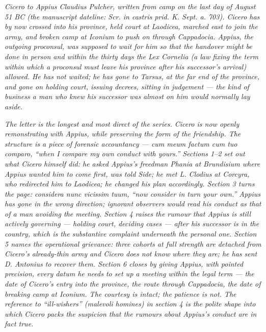 
\textit{Cicero to Appius Claudius Pulcher, written from
camp on the last day of August 51 BC (the manuscript
dateline: \textit{Scr. in castris prid. K. Sept. a.
703}). Cicero has by now crossed into his province,
held court at Laodicea, marched east to join the army,
and broken camp at Iconium to push on through
Cappadocia. Appius, the outgoing proconsul, was
supposed to wait for him so that the handover might be
done in person and within the thirty days the Lex
Cornelia (a law fixing the term within which a
proconsul must leave his province after his successor's
arrival) allowed. He has not waited; he has gone to
Tarsus, at the far end of the province, and gone on
holding court, issuing decrees, sitting in judgement
--- the kind of business a man who knew his successor
was almost on him would normally lay aside.}

\textit{The letter is the longest and most direct of
the series. Cicero is now openly remonstrating with
Appius, while preserving the form of the friendship.
The structure is a piece of forensic accountancy ---
\textit{cum meum factum cum tuo comparo}, ``when I
compare my own conduct with yours.'' Sections 1--2 set
out what Cicero himself did: he asked Appius's freedman
Phania at Brundisium where Appius wanted him to come
first, was told Side; he met L. Clodius at Corcyra,
who redirected him to Laodicea; he changed his plan
accordingly. Section 3 turns the page: \textit{considera
nunc vicissim tuum}, ``now consider in turn your own.''
Appius has gone in the wrong direction; ignorant
observers would read his conduct as that of a man
avoiding the meeting. Section 4 raises the rumour that
Appius is still actively governing --- holding court,
deciding cases --- after his successor is in the
country, which is the substantive complaint underneath
the personal one. Section 5 names the operational
grievance: three cohorts at full strength are detached
from Cicero's already-thin army and Cicero does not
know where they are; he has sent D. Antonius to recover
them. Section 6 closes by giving Appius, with pointed
precision, every datum he needs to set up a meeting
within the legal term --- the date of Cicero's entry
into the province, the route through Cappadocia, the
date of breaking camp at Iconium. The courtesy is
intact; the patience is not. The reference to
``ill-wishers'' (\textit{malevoli homines}) in section
4 is the polite shape into which Cicero packs the
suspicion that the rumours about Appius's conduct are
in fact true.}
